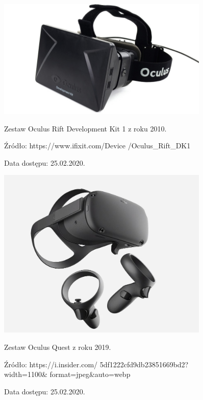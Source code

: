 \begin{figure}[ht]
    \centering
    \begin{minipage}{0.45\textwidth}
        \centering
        \includegraphics[width=0.9\textwidth]{images/oculusold.jpg} %
        \caption{Zestaw Oculus Rift Development Kit 1 z roku 2010.}
        \caption*{Źródło: https://www.ifixit.com/Device
        /Oculus\_Rift\_DK1}
        \caption*{Data dostępu: 25.02.2020.}
        \label{fig:rift}
    \end{minipage}\hfill
    \begin{minipage}{0.45\textwidth}
        \centering
        \includegraphics[width=0.9\textwidth]{images/oculusquest.jpg} %
        \caption{Zestaw Oculus Quest z roku 2019.}
        \caption*{Źródło: https://i.insider.com/
        5df1222cfd9db23851669bd2?width=1100&
        format=jpeg&auto=webp}
        \caption*{Data dostępu: 25.02.2020.}
        \label{fig:quest}
    \end{minipage}
\end{figure}

